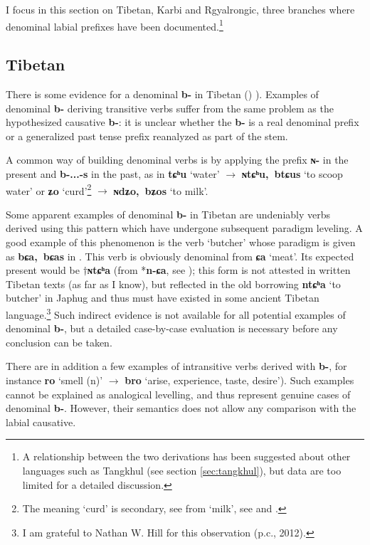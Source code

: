 \documentclass[oneside,a4paper,11pt]{article}
\newcommand{\ipa}[1]{\textbf{{\phon\mbox{#1}}}} %
\newcommand{\forme}[2]{\ipa{#1} `#2'}
\begin{document}
I focus in this section on Tibetan, Karbi and Rgyalrongic, three branches where denominal labial prefixes have been documented.\footnote{A relationship between the two derivations has been suggested about other languages such as Tangkhul (see section \ref{sec:tangkhul}), but data are too limited for a detailed discussion.  }

\subsection{Tibetan} \label{sec:tib.denom}
There is some evidence for a denominal \ipa{b-} in Tibetan (\citealt[100]{mazo04st}) \citealt[250-1]{zhang09cizu}). Examples of denominal \ipa{b-} deriving transitive verbs suffer from the same problem as the hypothesized causative \ipa{b-}: it is unclear whether the \ipa{b-} is a real denominal prefix or a generalized past tense prefix reanalyzed as part of the stem.

A common way of building denominal verbs is by applying the prefix \ipa{ɴ-} in the present and \ipa{b-...-s} in the past, as in \forme{tɕʰu}{water} $\rightarrow$ \forme{ɴtɕʰu, btɕus}{to scoop water} or \forme{ʑo}{curd}\footnote{The meaning `curd' is secondary, see from `milk', see \citet[29-30]{jacques14esquisse} and \citet{tournadre15chocha}.} $\rightarrow$ \forme{ɴdʑo, bʑos}{to milk}.

Some apparent examples of denominal \ipa{b-} in Tibetan are undeniably verbs derived using this pattern which have undergone subsequent paradigm leveling. A good example of this phenomenon is the verb `butcher' whose paradigm is given as \ipa{bɕa, bɕas} in \citet{bodrgya}. This verb is obviously denominal from \forme{ɕa}{meat}. Its expected present would be $\dagger$\ipa{ɴtɕʰa} (from *\ipa{n-ɕa}, see \citealt{lifk33}); this form is not attested in written Tibetan texts (as far as I know), but reflected in the old borrowing \forme{ntɕʰa}{to butcher} in Japhug and thus must have existed in some ancient Tibetan language.\footnote{I am grateful to Nathan W. Hill for this observation (p.c., 2012).} Such indirect evidence is not available for all potential examples of denominal \ipa{b-}, but a detailed case-by-case evaluation is necessary before any conclusion can be taken.

There are in addition a few examples of intransitive verbs derived with \ipa{b-}, for  instance \forme{ro}{smell (n)} $\rightarrow$ \forme{bro}{arise, experience, taste, desire}). Such examples cannot be explained as analogical levelling, and thus represent genuine cases of denominal \ipa{b-}. However, their semantics does not allow any comparison with the labial causative.
\end{document}
